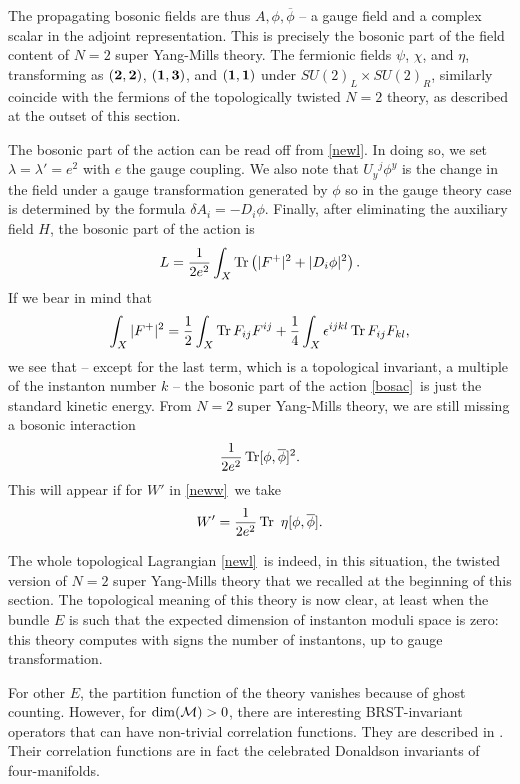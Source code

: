 \documentclass[12pt]{article}
\numberwithin{equation}{section}
\def\bar{\overline}
\DeclareMathOperator{\Tr}{Tr}
\begin{document}
The propagating bosonic fields are thus $A,\phi,\bar\phi$ -- a gauge
field and a complex scalar in the adjoint representation.  This is
precisely the bosonic part of the field content of $N=2$ super
Yang-Mills theory.  The fermionic fields $\psi$, $\chi$, and $\eta$,
transforming as $({\bf 2},{\bf 2})$, $({\bf 1},{\bf 3})$,
and $({\bf 1},{\bf 1})$ under $SU(2)_L
\times SU(2)_R$, similarly coincide with the fermions of the topologically
twisted $N=2$ theory, as described at the outset of this section.

The bosonic part of the action can be read off
from \eqref{newl}.  In doing so, we set $\lambda=\lambda'=e^2$ with $e$ the
gauge coupling.
We also note that $U_y{}^j\phi^y$ is the change in the field under
a gauge transformation generated by $\phi$ so in the gauge theory
case is determined by the formula $\delta A_i=-D_i\phi$.  Finally,
after eliminating the auxiliary field $H$, the bosonic part of the action is
\begin{equation}
  \label{bosac}
  L ={1\over 2e^2}\int_X\Tr\left( |F^+|^2 +|D_i\phi|^2\right).
\end{equation}
If we bear in mind that
\begin{equation}
  \label{osac}
  \int_X|F^+|^2={1\over 2}\int_X\Tr F_{ij}F^{ij}+{1\over 4} \int_X
  \epsilon^{ijkl}\Tr F_{ij}F_{kl},
\end{equation}
we see that -- except for the last term, which is a topological invariant,
a multiple of the instanton number $k$ -- the
bosonic part of the action \eqref{bosac}\ is just the standard kinetic energy.
{}From $N=2$ super Yang-Mills theory, we are still missing a bosonic
interaction
\begin{equation}
  \label{bosint}
  {1\over 2e^2}\Tr [\phi,\bar\phi]^2.
\end{equation}
This will appear if for $W'$ in \eqref{neww}\ we take
\begin{equation}
  \label{wprime}
  W'={1\over 2e^2}\Tr \,\,\eta [\phi,\bar\phi].
\end{equation}

The whole topological Lagrangian \eqref{newl}\ is indeed, in this situation,
the twisted version of $N=2$ super Yang-Mills theory
that we recalled at the beginning of this section.
The topological meaning of this theory
is now clear, at least
when the bundle $E$ is such that the expected dimension of instanton
moduli space is zero: this theory computes with signs the number
of instantons, up to gauge transformation.

For other $E$, the partition
function of the theory vanishes because of ghost counting.  However,
for ${\rm dim}({\cal M})>0$, there are interesting BRST-invariant
operators that can have non-trivial correlation functions.  They are
described in \cite{tqft}.  Their
correlation functions are in fact the celebrated Donaldson invariants
of four-manifolds.
\end{document}

